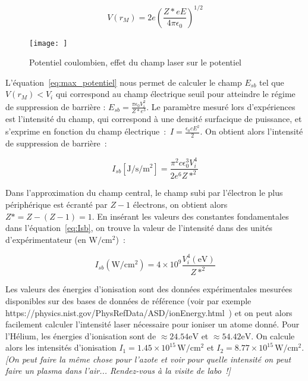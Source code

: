 \documentclass[a4paper]{book}
\begin{document}
\begin{equation}
    V(r_M)=2e\left(\frac{Z*eE}{4\pi\epsilon_0}\right)^{1/2}
    \label{eq:max_potentiel}
\end{equation}

\begin{figure}[!htbp]
\begin{center}
\texttt{[image: ]}
\end{center}
\caption{Potentiel coulombien, effet du champ laser sur le potentiel}
\label{fig:potentiel}
\end{figure}

L'équation~\ref{eq:max_potentiel} nous permet de calculer le champ $E_{sb}$ tel que $V(r_M)<V_i$ qui correspond au champ électrique seuil pour atteindre le régime de suppression de barrière : $E_{sb}=\frac{\pi\epsilon_0V_i^2}{Z*e^3}$. Le paramètre mesuré lors d'expériences est l'intensité du champ, qui correspond à une densité surfacique de puissance, et s'exprime en fonction du champ électrique~:~$I=\frac{\epsilon_0cE^2}{2}$. On obtient alors l'intensité de suppression de barrière~:

\begin{equation}
    I_{sb}\left[\mathrm{J/s/m^2}\right]=\frac{\pi^2c\epsilon_0^3V_i^4}{2e^6Z*^2}
    \label{eq:Isb}
\end{equation}

Dans l'approximation du champ central, le champ subi par l'électron le plus périphérique est écranté par $Z-1$ électrons, on obtient alors $Z* = Z-(Z-1) = 1$. En insérant les valeurs des constantes fondamentales dans l'équation~\ref{eq:Isb}, on trouve la valeur de l'intensité dans des unités d'expérimentateur (en $\mathrm{W/cm^2}$)~:

\begin{equation}
    I_{sb}(\mathrm{W/cm^2})=4\times10^9\frac{V_i^4\mathrm{(eV)}}{Z*^2}
\end{equation}

Les valeurs des énergies d'ionisation sont des données expérimentales mesurées disponibles sur des bases de données de référence (voir par exemple https://physics.nist.gov/PhysRefData/ASD/ionEnergy.html~) et on peut alors facilement calculer l'intensité laser nécessaire pour ioniser un atome donné. Pour l'Hélium, les énergies d'ionisation sont de $\approx 24.54\mathrm{eV}$ et $\approx 54.42\mathrm{eV}$. On calcule alors les intensités d'ionisation $I_1=1.45\times10^{15}\,\mathrm{W/cm^2}$ et $I_2=8.77\times10^{15}\,\mathrm{W/cm^2}$. \textit{[On peut faire la même chose pour l'azote et voir pour quelle intensité on peut faire un plasma dans l'air... Rendez-vous à la visite de labo~!]}
\end{document}
